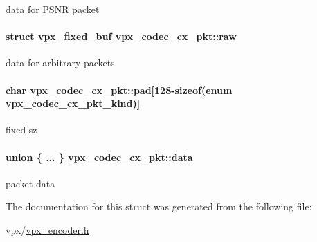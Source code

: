 data for P\-S\-N\-R packet \hypertarget{structvpx__codec__cx__pkt_acc7ee91ea9c907aea7c3b953324f7c26}{
\paragraph[{raw}]{\setlength{\rightskip}{0pt plus 5cm}struct {\bf vpx\-\_\-fixed\-\_\-buf} vpx\-\_\-codec\-\_\-cx\-\_\-pkt\-::raw}}\label{structvpx__codec__cx__pkt_acc7ee91ea9c907aea7c3b953324f7c26}
data for arbitrary packets \hypertarget{structvpx__codec__cx__pkt_a49a0ba012fdabd49bff8069dfacf6ced}{
\paragraph[{pad}]{\setlength{\rightskip}{0pt plus 5cm}char vpx\-\_\-codec\-\_\-cx\-\_\-pkt\-::pad\mbox{[}128-\/sizeof(enum {\bf vpx\-\_\-codec\-\_\-cx\-\_\-pkt\-\_\-kind})\mbox{]}}}\label{structvpx__codec__cx__pkt_a49a0ba012fdabd49bff8069dfacf6ced}
fixed sz \hypertarget{structvpx__codec__cx__pkt_a7f97b060a23b7e89fe5b885c0074f696}{
\paragraph[{data}]{\setlength{\rightskip}{0pt plus 5cm}union \{ ... \}   vpx\-\_\-codec\-\_\-cx\-\_\-pkt\-::data}}\label{structvpx__codec__cx__pkt_a7f97b060a23b7e89fe5b885c0074f696}
packet data 

The documentation for this struct was generated from the following file\-:\begin{DoxyCompactItemize}
\item 
vpx/\hyperlink{vpx__encoder_8h}{vpx\-\_\-encoder.\-h}\end{DoxyCompactItemize}
